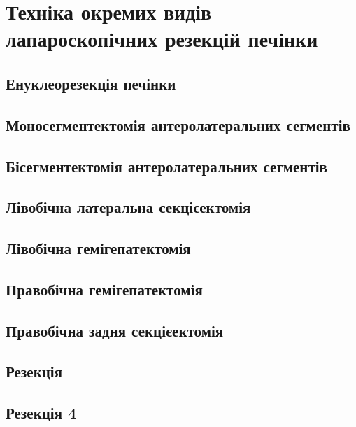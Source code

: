 \chapter{Техніка окремих видів лапароскопічних резекцій печінки} 

\begin{refsection}

\section{Енуклеорезекція печінки}


\section{Моносегментектомія антеролатеральних сегментів}

\section{Бісегментектомія антеролатеральних сегментів}

\section{Лівобічна латеральна секцієектомія}

\section{Лівобічна гемігепатектомія}

\section{Правобічна гемігепатектомія}

\section{Правобічна задня секцієектомія}

\section{Резекція }

\section{Резекція 4 }



\printbibliography [heading=subbibliography]
\end{refsection}